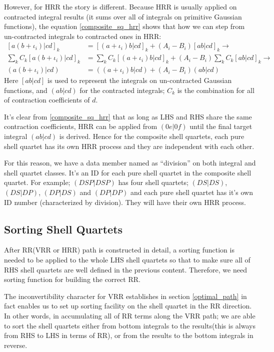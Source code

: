 However, for HRR the story is different. Because HRR is usually applied on
contracted integral results (it sums over all of integrals on 
primitive Gaussian functions), the equation \ref{composite_sq_hrr}
shows that how we can step from
un-contracted integrals to contracted ones in HRR:
\begin{align}\label{composite_sq_hrr}
 [a(b+\iota_{i})|cd]_{k} &= [(a+\iota_{i})b|cd]_{k} + 
(A_{i} - B_{i})[ab|cd]_{k} \rightarrow \nonumber \\
\sum_{k}C_{k}[a(b+\iota_{i})|cd]_{k} &= \sum_{k}C_{k}[(a+\iota_{i})b|cd]_{k} + 
(A_{i} - B_{i})\sum_{k}C_{k}[ab|cd]_{k} \rightarrow \nonumber \\
(a(b+\iota_{i})|cd) &= ((a+\iota_{i})b|cd) + 
(A_{i} - B_{i})(ab|cd)
\end{align}
Here $[ab|cd]$ is used to represent the integrals on un-contracted Gaussian 
functions, and $(ab|cd)$ for the contracted integrals; $C_{k}$ is the 
combination for all of contraction coefficients of $d$.

It's clear from \ref{composite_sq_hrr} that as long as LHS and RHS share the 
same contraction coefficients, HRR can be applied from $(0e|0f)$ until
the final target integral $(ab|cd)$ is derived. Hence for the composite 
shell quartets, each pure shell quartet has its own HRR process and they
are independent with each other.

For this reason, we have a data member named as ``division'' on both
integral and shell quartet classes. It's an ID for each pure shell quartet
in the composite shell quartet. For example; $(DSP|DSP)$ has four shell quartets;
$(DS|DS)$, $(DS|DP)$, $(DP|DS)$ and $(DP|DP)$ and each pure shell quartet has it's 
own ID number (characterized by division). They will have their own
HRR process.

\subsection{Sorting Shell Quartets}
%
%
\label{sort_shell_quartet}

After RR(VRR or HRR) path is constructed in detail, a sorting 
function is needed to be applied to the whole LHS shell quartets
so that to make sure all of RHS shell quartets are well defined
in the previous content. Therefore, we need sorting function for 
building the correct RR.

The inconvertibility character for VRR establishes in section 
\ref{optimal_path} in fact enables us to set up sorting facility
on the shell quartet in the RR direction. In other words, in 
accumulating all of RR terms along the VRR path; we are able 
to sort the shell quartets either from bottom integrals to
the results(this is always from RHS to LHS in terms of RR),
or from the results to the bottom integrals in reverse.

